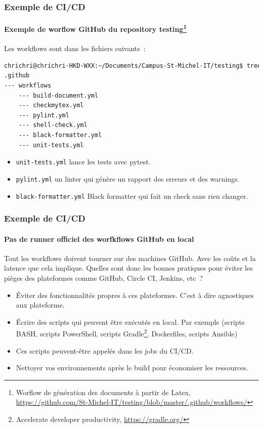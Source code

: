 \documentclass{beamer}
\begin{document}
    \begin{frame}[fragile]
        \frametitle{Exemple de CI/CD}
        \framesubtitle{Exemple de worflow GitHub du repository testing{\footnote{Worflow de génération des documents à partir de Latex, \url{https://github.com/St-Michel-IT/testing/blob/master/.github/workflows/}}}}
        \transdissolve
        Les workflows sont dans les fichiers suivants~:
        \begin{lstlisting}[language=sh]
chrichri@chrichri-HKD-WXX:~/Documents/Campus-St-Michel-IT/testing$ tree .github
.github
--- workflows
    --- build-document.yml
    --- checkmytex.yml
    --- pylint.yml
    --- shell-check.yml
    --- black-formatter.yml
    --- unit-tests.yml
        \end{lstlisting}
        \begin{itemize}
            \item \lstinline{unit-tests.yml} lance les tests avec pytest.
            \item \lstinline{pylint.yml} un linter qui génère un rapport des erreurs et des warnings.
            \item \lstinline{black-formatter.yml} Black formatter qui fait un check sans rien changer.
        \end{itemize}
    \end{frame}

    \begin{frame}
        \frametitle{Exemple de CI/CD}
        \framesubtitle{Pas de runner officiel des worfkflows GitHub en local}
        \transdissolve
        Tout les workflows doivent tourner sur des machines GitHub.
        Avec les coûts et la latence que cela implique.
        \bigbreak
        Quelles sont donc les bonnes pratiques pour éviter les pièges des plateformes comme GitHub, Circle CI, Jenkins, etc~?
        \pause
        \begin{itemize}
            \item Éviter des fonctionnalités propres à ces plateformes.
            C'est à dire agnostiques aux plateforme.
            \item Écrire des scripts qui peuvent être exécutés en local.
            Par exemple (scripts BASH, scripts PowerShell, scripts Gradle\footnote{\label{gradle}Accelerate developer productivity, \url{https://gradle.org/}}, Dockerfiles, scripts Ansible)
            \item Ces scripts peuvent-être appelés dans les jobs du CI/CD.
            \item Nettoyer vos environnements après le build pour économiser les ressources.
        \end{itemize}
    \end{frame}
\end{document}
